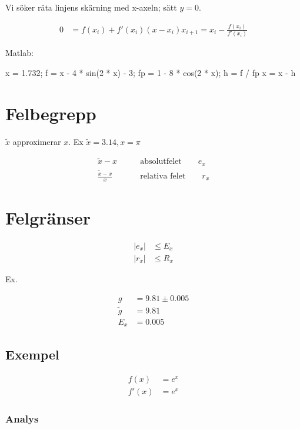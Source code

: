 \documentclass[a4paper,10pt,swedish]{memoir}
\numberwithin{equation}{subsection}
\begin{document}
Vi söker räta linjens skärning med x-axeln; sätt $y=0$.

\begin{align}
0&=f(x_i)+f'(x_i)(x-x_i)
x_{i+1}=x_i-\frac{f(x_i)}{f'(x_i)}
\end{align}

Matlab:

\begin{matlabcode}
x = 1.732;
f = x - 4 * sin(2 * x) - 3;
fp = 1 - 8 * cos(2 * x); %
h = f / fp
x = x - h
\end{matlabcode}

\section{Felbegrepp}

$\tilde{x}$ approximerar $x$. Ex $\tilde{x}=3.14, x=\pi$

\begin{align}
\tilde{x}-x\qquad&\text{absolutfelet} \qquad e_x \\
\frac{\tilde{x}-x}{x}\qquad&\text{relativa felet}\qquad r_x
\end{align}

\section{Felgränser}

\begin{align}
|e_x| &\leq E_x \\
|r_x| &\leq R_x
\end{align}

Ex.

\begin{align}
g&=9.81\pm 0.005 \\
\tilde{g}&=9.81 \\
E_x&=0.005
\end{align}

\subsection{Exempel}

\begin{align}
f(x)&=e^x\\
f'(x)&=e^x
\end{align}

\subsubsection{Analys}
\end{document}
